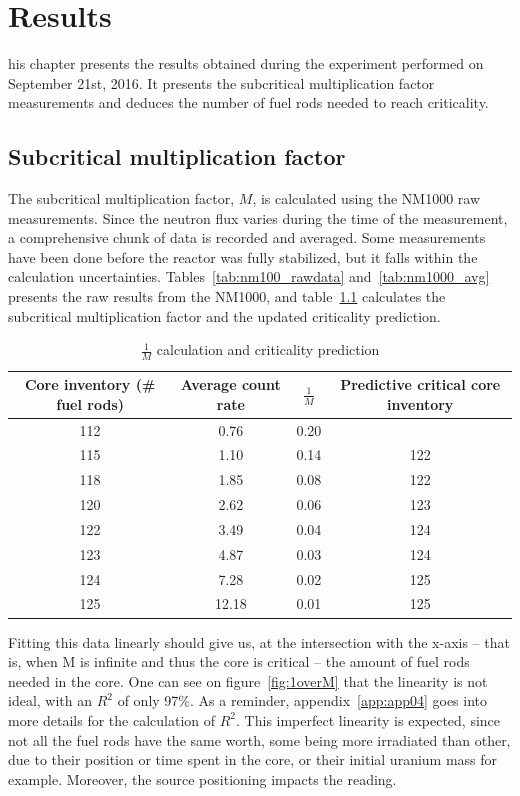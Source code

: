 %
%
\let\textcircled=\pgftextcircled
\chapter{Results}
\label{chap:result}

his chapter presents the results obtained during the experiment performed on September 21st, 2016. It presents the subcritical multiplication factor measurements and deduces the number of fuel rods needed to reach criticality.

\section{Subcritical multiplication factor}

The subcritical multiplication factor, $M$, is calculated using the NM1000 raw measurements. Since the neutron flux varies during the time of the measurement, a comprehensive chunk of data is recorded and averaged. Some measurements have been done before the reactor was fully stabilized, but it falls within the calculation uncertainties. Tables~\ref{tab:nm100_rawdata} and~\ref{tab:nm1000_avg} presents the raw results from the NM1000, and table~\ref{tab:critpred} calculates the subcritical multiplication factor and the updated criticality prediction.

\begin{table}[!htb]
    \centering
    \begin{tabular}{cccc}
        Core inventory (\# fuel rods) & Average count rate & $\frac{1}{M}$ & Predictive critical core inventory \\ \hline\hline
        112 & 0.76  & 0.20 &     \\
        115 & 1.10  & 0.14 & 122 \\
        118 & 1.85  & 0.08 & 122 \\
        120 & 2.62  & 0.06 & 123 \\
        122 & 3.49  & 0.04 & 124 \\
        123 & 4.87  & 0.03 & 124 \\
        124 & 7.28  & 0.02 & 125 \\
        125 & 12.18 & 0.01 & 125
    \end{tabular}
    \caption{$\frac{1}{M}$ calculation and criticality prediction}\label{tab:critpred}
\end{table}

Fitting this data linearly should give us, at the intersection with the x-axis -- that is, when M is infinite and thus the core is critical -- the amount of fuel rods needed in the core. One can see on figure~\ref{fig:1overM} that the linearity is not ideal, with an $R^2$ of only 97\%. As a reminder, appendix~\ref{app:app04} goes into more details for the calculation of $R^2$. This imperfect linearity is expected, since not all the fuel rods have the same worth, some being more irradiated than other, due to their position or time spent in the core, or their initial uranium mass for example. Moreover, the source positioning impacts the reading.

